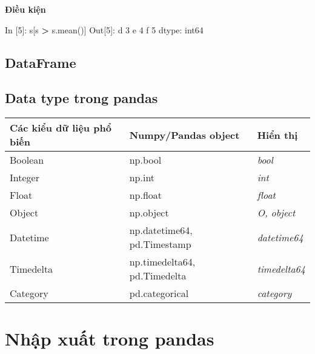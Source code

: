 \documentclass[
]{book}
\newenvironment{Shaded}{\begin{snugshade}}{\end{snugshade}}
\newcommand{\DecValTok}[1]{\textcolor[rgb]{0.00,0.00,0.81}{#1}}
\newcommand{\NormalTok}[1]{#1}
\newcommand{\OperatorTok}[1]{\textcolor[rgb]{0.81,0.36,0.00}{\textbf{#1}}}
\begin{document}
\textbf{Điều kiện}

\begin{Shaded}
\begin{Highlighting}[]
\NormalTok{In [}\DecValTok{5}\NormalTok{]: s[s }\OperatorTok{\textgreater{}}\NormalTok{ s.mean()]}
\NormalTok{Out[}\DecValTok{5}\NormalTok{]:}
\NormalTok{d    }\DecValTok{3}
\NormalTok{e    }\DecValTok{4}
\NormalTok{f    }\DecValTok{5}
\NormalTok{dtype: int64}
\end{Highlighting}
\end{Shaded}

\hypertarget{dataframe}{%
\section{DataFrame}\label{dataframe}}

\hypertarget{data-type-trong-pandas}{%
\section{Data type trong pandas}\label{data-type-trong-pandas}}

\begin{longtable}[]{@{}
  >{\raggedright\arraybackslash}p{}
  >{\raggedright\arraybackslash}p{}
  >{\raggedright\arraybackslash}p{}@{}}
\toprule
Các kiểu dữ liệu
phổ biến & Numpy/Pandas
object & Hiển thị \\
\midrule
\endhead
Boolean & np.bool & \emph{bool} \\
Integer & np.int & \emph{int} \\
Float & np.float & \emph{float} \\
Object & np.object & \emph{O, object} \\
Datetime & np.datetime64,
pd.Timestamp & \emph{datetime64} \\
Timedelta & np.timedelta64,
pd.Timedelta & \emph{timedelta64} \\
Category & pd.categorical & \emph{category} \\
\bottomrule
\end{longtable}

\hypertarget{nhux1eadp-xuux1ea5t-trong-pandas}{%
\chapter{Nhập xuất trong pandas}\label{nhux1eadp-xuux1ea5t-trong-pandas}}
\end{document}
